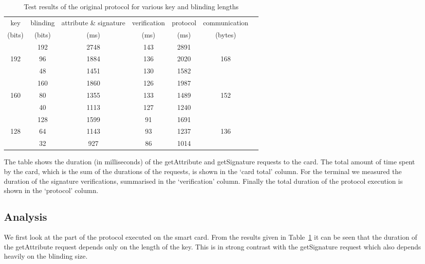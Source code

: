 \begin{table}
  \centering
  \caption{Test results of the original protocol for various key and blinding
lengths}\label{tab:results_basic}
  \renewcommand{\tabcolsep}{1.25mm}
  \renewcommand{\arraystretch}{1.25}
  \begin{tabular}{| c | c | c | c | c | c | c |}\hline

  key & blinding & attribute \& signature & verification & protocol &
communication \\
  (bits) & (bits) & (ms) & (ms) & (ms) & (bytes) \\\hline
  \hline

      & 192 & 2748 & 143 & 2891 & \\\cline{2-5}
  192 &  96 & 1884 & 136 & 2020 & 168 \\\cline{2-5}
      &  48 & 1451 & 130 & 1582 & \\\hline
  \hline

      & 160 & 1860 & 126 & 1987 & \\\cline{2-5}
  160 &  80 & 1355 & 133 & 1489 & 152 \\\cline{2-5}
      &  40 & 1113 & 127 & 1240 & \\\hline
  \hline

      & 128 & 1599 & 91 & 1691 & \\\cline{2-5}
  128 &  64 & 1143 & 93 & 1237 & 136 \\\cline{2-5}
      &  32 &  927 & 86 & 1014 & \\\hline
  \end{tabular}
\end{table}


The table shows the duration (in milliseconds) of the \textsf{getAttribute}
and \textsf{getSignature} requests to the card. The total amount of time
spent by the card, which is the sum of the durations of the requests, is
shown in the `card total' column. For the terminal we measured the duration
of the signature verifications, summarised in the `verification' column.
Finally the total duration of the protocol execution is shown in the
`protocol' column.

\subsection{Analysis}\label{sec:analysis}

We first look at the part of the protocol executed on the smart card. From the
results given in Table~\ref{tab:results_basic} it can be seen that the duration of
the \textsf{getAttribute} request depends only on the length of the key. This is in
strong contrast with the \textsf{getSignature} request which also depends heavily
on the blinding size.

